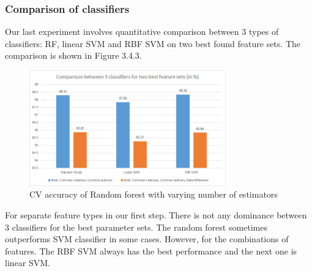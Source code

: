 \documentclass{article}
\begin{document}
\subsubsection{Comparison of classifiers}
Our last experiment involves quantitative comparison between 3 types of classifiers: RF, linear SVM and RBF SVM on two best found feature sets. The comparison is shown in Figure 3.4.3.
\begin{figure}[htb]
\begin{minipage}[b]{1.0\linewidth}
  \centering
  \centerline{\includegraphics[width=8.5cm]{classifier.png}}
\end{minipage}
\label{fig:classifier}
\caption{CV accuracy of Random forest with varying number of estimators}
\end{figure}
For separate feature types in our first step. There is not any dominance between 3 classifiers for the best parameter sets. The random forest sometimes outperforms SVM classifier in some cases. However, for the combinations of features. The RBF SVM always has the best performance and the next one is linear SVM.
\end{document}
